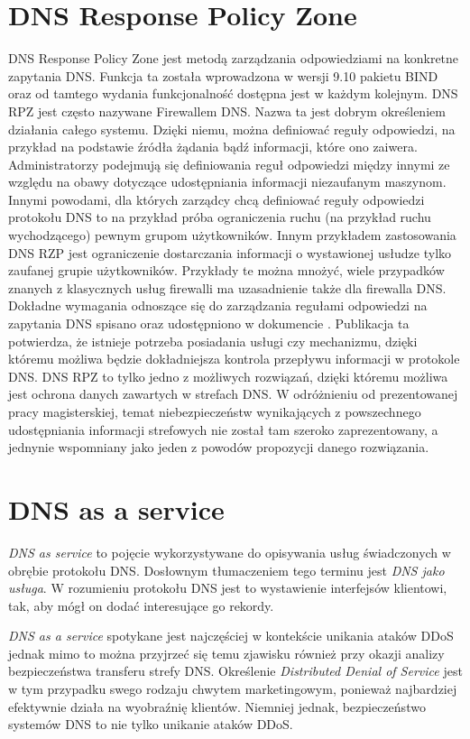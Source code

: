 \section{DNS Response Policy Zone}
DNS Response Policy Zone jest metodą zarządzania odpowiedziami na konkretne zapytania DNS. Funkcja ta została wprowadzona w wersji
9.10 pakietu BIND oraz od tamtego wydania funkcjonalność dostępna jest w każdym kolejnym. DNS RPZ jest często nazywane Firewallem DNS.
Nazwa ta jest dobrym określeniem działania całego systemu. Dzięki niemu, można definiować reguły odpowiedzi, na przykład na podstawie
źródła żądania bądź informacji, które ono zaiwera. Administratorzy podejmują się definiowania reguł odpowiedzi między innymi
ze względu na obawy dotyczące udostępniania
informacji niezaufanym maszynom. Innymi powodami, dla których zarządcy chcą definiować reguły odpowiedzi protokołu DNS to na przykład
próba ograniczenia ruchu (na przykład ruchu wychodzącego) pewnym grupom użytkowników. Innym przykładem zastosowania DNS RZP
jest ograniczenie dostarczania informacji o wystawionej usłudze tylko zaufanej grupie użytkowników. Przykłady te można mnożyć,
wiele przypadków znanych z klasycznych usług firewalli ma uzasadnienie także dla firewalla DNS. Dokładne wymagania odnoszące się do
zarządzania regułami odpowiedzi na zapytania DNS spisano oraz udostępniono w dokumencie \cite{I-D.ietf-dnsop-dns-rpz}. Publikacja ta
potwierdza, że istnieje potrzeba posiadania usługi czy mechanizmu, dzięki któremu możliwa będzie dokładniejsza kontrola przepływu
informacji w protokole DNS. DNS RPZ to tylko jedno z możliwych rozwiązań, dzięki któremu
możliwa jest ochrona danych zawartych w strefach DNS. W odróżnieniu od prezentowanej pracy magisterskiej, temat niebezpieczeństw
wynikających z powszechnego udostępniania informacji
strefowych nie został tam szeroko zaprezentowany, a jednynie wspomniany jako jeden z powodów propozycji danego rozwiązania.

\section{DNS as a service}
\textit{DNS as service} to pojęcie wykorzystywane do opisywania usług świadczonych w obrębie protokołu DNS. Dosłownym tłumaczeniem tego
terminu jest \textit{DNS jako usługa}. W rozumieniu protokołu DNS jest to wystawienie interfejsów klientowi, tak,
aby mógł on dodać interesujące go rekordy.

\textit{DNS as a service} spotykane jest najczęściej w kontekście unikania ataków DDoS jednak mimo to można przyjrzeć się temu
zjawisku również przy okazji analizy bezpieczeństwa transferu strefy DNS. Określenie \textit{Distributed Denial of Service} jest w
tym przypadku swego rodzaju chwytem marketingowym, ponieważ najbardziej efektywnie działa na wyobraźnię klientów. Niemniej jednak,
bezpieczeństwo systemów DNS to nie tylko unikanie ataków DDoS.

